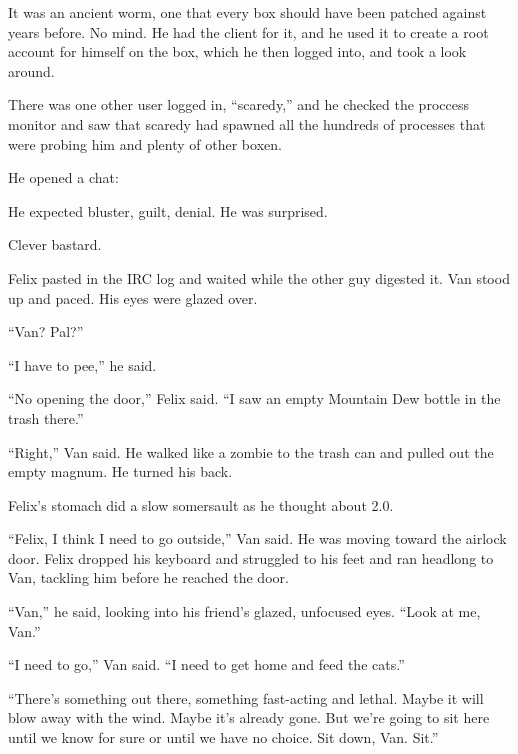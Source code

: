 It was an ancient worm, one that every box should have been patched
against years before. No mind. He had the client for it, and he
used it to create a root account for himself on the box, which he
then logged into, and took a look around.

There was one other user logged in, “scaredy,” and he checked the
proccess monitor and saw that scaredy had spawned all the hundreds
of processes that were probing him and plenty of other boxen.

He opened a chat:

He expected bluster, guilt, denial. He was surprised.

Clever bastard.

Felix pasted in the IRC log and waited while the other guy digested
it. Van stood up and paced. His eyes were glazed over.

“Van? Pal?”

“I have to pee,” he said.

“No opening the door,” Felix said. “I saw an empty Mountain Dew
bottle in the trash there.”

“Right,” Van said. He walked like a zombie to the trash can and
pulled out the empty magnum. He turned his back.

Felix’s stomach did a slow somersault as he thought about 2.0.

“Felix, I think I need to go outside,” Van said. He was moving
toward the airlock door. Felix dropped his keyboard and struggled
to his feet and ran headlong to Van, tackling him before he reached
the door.

“Van,” he said, looking into his friend’s glazed, unfocused eyes.
“Look at me, Van.”

“I need to go,” Van said. “I need to get home and feed the cats.”

“There’s something out there, something fast-acting and lethal.
Maybe it will blow away with the wind. Maybe it’s already gone. But
we’re going to sit here until we know for sure or until we have no
choice. Sit down, Van. Sit.”

